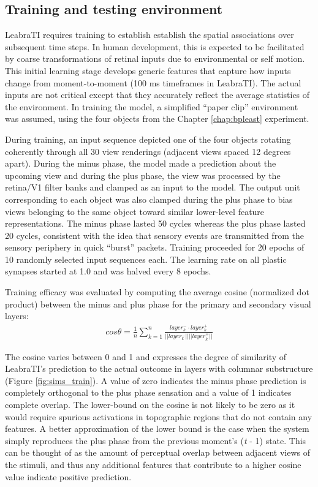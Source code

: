 \documentclass[dwyatte_dissertation.tex]{subfiles}
\begin{document}
\subsection{Training and testing environment}
LeabraTI requires training to establish establish the spatial associations over subsequent time steps. In human development, this is expected to be facilitated by coarse transformations of retinal inputs due to environmental or self motion. This initial learning stage develops generic features that capture how inputs change from moment-to-moment (100 ms timeframes in LeabraTI). The actual inputs are not critical except that they accurately reflect the average statistics of the environment. In training the model, a simplified  ``paper clip'' environment was assumed, using the four objects from the Chapter \ref{chap:bpleast} experiment.

During training, an input sequence depicted one of the four objects rotating coherently through all 30 view renderings (adjacent views spaced 12 degrees apart). During the minus phase, the model made a prediction about the upcoming view and during the plus phase, the view was processed by the retina/V1 filter banks and clamped as an input to the model. The output unit corresponding to each object was also clamped during the plus phase to bias views belonging to the same object toward similar lower-level feature representations. The minus phase lasted 50 cycles whereas the plus phase lasted 20 cycles, consistent with the idea that sensory events are transmitted from the sensory periphery in quick ``burst'' packets.  Training proceeded for 20 epochs of 10 randomly selected input sequences each. The learning rate on all plastic synapses started at 1.0 and was halved every 8 epochs.

Training efficacy was evaluated by computing the average cosine (normalized dot product) between the minus and plus phase for the primary and secondary visual layers:
\begin{align*}
cos \theta = \frac{1}{n}\sum_{k=1}^{n}\frac{layer_k^- \cdot{} layer_k^+}{||layer_k^-||||layer_k^+||}
\end{align*}

The cosine varies between 0 and 1 and expresses the degree of similarity of LeabraTI's prediction to the actual outcome in layers with columnar substructure (Figure \ref{fig:sims_train}). A value of zero indicates the minus phase prediction is completely orthogonal to the plus phase sensation and a value of 1 indicates complete overlap. The lower-bound on the cosine is not likely to be zero as it would require spurious activations in topographic regions that do not contain any features. A better approximation of the lower bound is the case when the system simply reproduces the plus phase from the previous moment's (\textit{t} - 1) state. This can be thought of as the amount of perceptual overlap between adjacent views of the stimuli, and thus any additional features that contribute to a higher cosine value indicate positive prediction.
\end{document}
